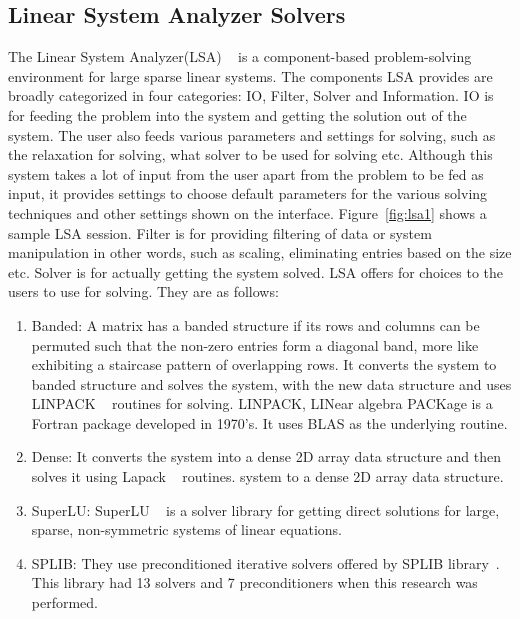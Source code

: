 \subsection{Linear System Analyzer Solvers}
The Linear System Analyzer(LSA) ~\cite{lsa} is a component-based problem-solving environment for large sparse linear systems. The components LSA provides are broadly categorized in four categories: IO, Filter, Solver and Information. IO is for feeding the problem into the system and getting the solution out of the system. The user also feeds various parameters and settings for solving, such as the relaxation for solving, what solver to be used for solving etc. Although this system takes a lot of input from the user apart from the problem to be fed as input, it provides settings to choose default parameters for the various solving techniques and other settings shown on the interface. Figure~\ref{fig:lsa1} shows a sample LSA session. Filter is for providing filtering of data or system manipulation in other words, such as scaling, eliminating entries based on the size etc. Solver is for actually getting the system solved. LSA offers for choices to the users to use for solving. They are as follows:

\begin{enumerate}
\item Banded: A matrix has a banded structure if its rows and columns can be permuted such that the non-zero entries form a diagonal band, more like exhibiting a staircase pattern of overlapping rows. It converts the system to banded structure and solves the system, with the new data structure and uses LINPACK ~\cite{linpack} routines for solving. LINPACK, LINear algebra PACKage is a Fortran package developed in 1970's. It uses BLAS as the underlying routine.
\item Dense: It converts the system into a dense 2D array data structure and then solves it using Lapack ~\cite{lapack} routines.
system to a dense 2D array data structure.
\item SuperLU: SuperLU ~\cite{superlu} is a solver library for getting direct solutions for large, sparse, non-symmetric systems of linear equations.
\item SPLIB: They use preconditioned iterative solvers offered by SPLIB library~\cite{splib}. This library had 13 solvers and 7 preconditioners when this research was performed.
\end{enumerate}


